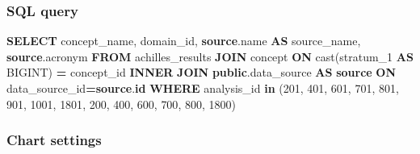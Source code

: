 \documentclass[
]{book}
\newenvironment{Shaded}{\begin{snugshade}}{\end{snugshade}}
\newcommand{\DecValTok}[1]{\textcolor[rgb]{0.00,0.00,0.81}{#1}}
\newcommand{\FunctionTok}[1]{\textcolor[rgb]{0.00,0.00,0.00}{#1}}
\newcommand{\KeywordTok}[1]{\textcolor[rgb]{0.13,0.29,0.53}{\textbf{#1}}}
\newcommand{\NormalTok}[1]{#1}
\newcommand{\OperatorTok}[1]{\textcolor[rgb]{0.81,0.36,0.00}{\textbf{#1}}}
\begin{document}
\hypertarget{sql-query-29}{%
\subsubsection*{SQL query}\label{sql-query-29}}

\begin{Shaded}
\begin{Highlighting}[]
\KeywordTok{SELECT}\NormalTok{ concept\_name,}
\NormalTok{     domain\_id,}
     \KeywordTok{source}\NormalTok{.name }\KeywordTok{AS}\NormalTok{ source\_name,}
     \KeywordTok{source}\NormalTok{.acronym}
\KeywordTok{FROM}\NormalTok{ achilles\_results}
\KeywordTok{JOIN}\NormalTok{ concept }\KeywordTok{ON} \FunctionTok{cast}\NormalTok{(stratum\_1 }\KeywordTok{AS}\NormalTok{ BIGINT) }\OperatorTok{=}\NormalTok{ concept\_id}
\KeywordTok{INNER} \KeywordTok{JOIN} \KeywordTok{public}\NormalTok{.data\_source }\KeywordTok{AS} \KeywordTok{source} \KeywordTok{ON}\NormalTok{ data\_source\_id}\OperatorTok{=}\KeywordTok{source}\NormalTok{.}\KeywordTok{id}
\KeywordTok{WHERE}\NormalTok{ analysis\_id }\KeywordTok{in}\NormalTok{ (}\DecValTok{201}\NormalTok{, }\DecValTok{401}\NormalTok{, }\DecValTok{601}\NormalTok{, }\DecValTok{701}\NormalTok{, }\DecValTok{801}\NormalTok{, }\DecValTok{901}\NormalTok{, }\DecValTok{1001}\NormalTok{, }\DecValTok{1801}\NormalTok{, }\DecValTok{200}\NormalTok{, }\DecValTok{400}\NormalTok{, }\DecValTok{600}\NormalTok{, }\DecValTok{700}\NormalTok{, }\DecValTok{800}\NormalTok{, }\DecValTok{1800}\NormalTok{)}
\end{Highlighting}
\end{Shaded}

\hypertarget{chart-settings-31}{%
\subsubsection*{Chart settings}\label{chart-settings-31}}
\end{document}
